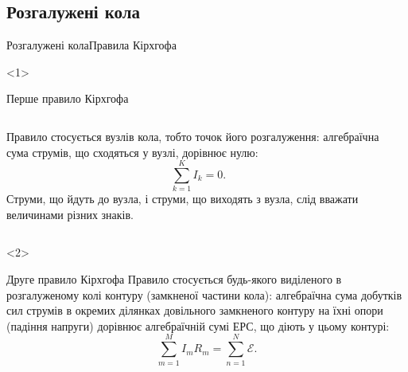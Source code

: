 \documentclass[onlytextwidth]{beamer}
\begin{document}
\subsection{Розгалужені кола}



\begin{frame}{Розгалужені кола}{Правила Кірхгофа}
	\begin{onlyenv}
		\begin{block}{\normalsize Перше правило Кірхгофа}\justifying\small
			\begin{columns}
				\begin{column}{0.8\linewidth}
					Правило стосується \alert{вузлів} кола, тобто точок його розгалуження: алгебраїчна сума струмів, що сходяться у вузлі,
					дорівнює нулю:
					\begin{equation*}
						\sum\limits_{k=1}^{K} I_k = 0.
					\end{equation*}
					\alert{Струми, що йдуть до вузла, і струми, що виходять з вузла, слід вважати величинами різних знаків.}
				\end{column}
				\begin{column}{0.2\linewidth}
					
				\end{column}
			\end{columns}
		\end{block}
	\end{onlyenv}
	\begin{onlyenv}
		\begin{block}{\normalsize Друге правило Кірхгофа}\justifying\small
			Правило стосується будь-якого виділеного в розгалуженому колі \alert{контуру (замкненої частини кола)}: алгебраїчна сума добутків сил
			струмів в окремих ділянках
			довільного замкненого контуру на їхні опори (падіння напруги) дорівнює алгебраїчній сумі ЕРС, що діють у цьому контурі:
			\begin{equation*}
				\sum\limits_{m=1}^{M} I_m R_m = \sum\limits_{n=1}^{N} \mathcal{E}.
			\end{equation*}
		\end{block}
		
	\end{onlyenv}
\end{frame}


\end{document}
